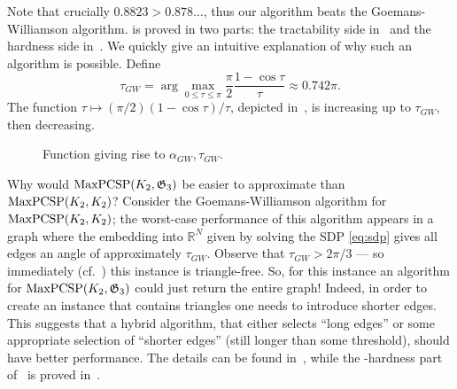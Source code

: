\documentclass[a4paper,11pt, DIV=11]{scrartcl}
\renewcommand{\G}{\ensuremath{\mathfrak{G}}}
\DeclareMathOperator{\maxPCSP}{\textup{MaxPCSP}}
\renewcommand{\R}{\ensuremath{\mathbb{R}}}
\theoremstyle{plain}
\theoremstyle{definition}
\begin{document}
Note that crucially $0.8823 > 0.878\ldots$, thus our algorithm beats the Goemans-Williamson algorithm.
 is proved in two parts: the tractability side
in~ and the hardness side in~. We quickly give an intuitive explanation of why such an algorithm is possible.
Define
\[
\tau_{GW} = 
\arg \max_{0\leq \tau \leq \pi} \frac{\pi}{2}\frac{1 - \cos \tau}{\tau} \approx 0.742 \pi.
\]
The function $\tau \mapsto (\pi / 2) (1 - \cos \tau) / \tau$, depicted in~, is increasing up to $\tau_{GW}$, then decreasing.
\begin{figure}[thbp]
    \centering
    \caption{Function giving rise to $\alpha_{GW}, \tau_{GW}$.}
    \label{fig:GW}
\end{figure}
Why would $\maxPCSP(K_2, \G_3)$ be easier to approximate than $\maxPCSP(K_2, K_2)$? Consider the Goemans-Williamson algorithm for $\maxPCSP(K_2, K_2)$; the worst-case performance of this algorithm appears in a graph where the embedding into $\R^N$ given by solving the SDP \eqref{eq:sdp} gives all edges an angle of approximately $\tau_{GW}$. Observe that $\tau_{GW} > 2\pi /3$ --- so immediately (cf.~) this instance is triangle-free. So, for this instance an algorithm for $\maxPCSP(K_2, \G_3)$ could just return the entire graph! Indeed, in order to create an instance that contains triangles
one needs to introduce shorter edges. This suggests that a hybrid algorithm, that either selects ``long edges'' or some appropriate selection of ``shorter edges''  (still longer than some threshold), should have better performance.
The details can be found in~, while the \NP-hardness part
of~ is proved in~.
\end{document}
